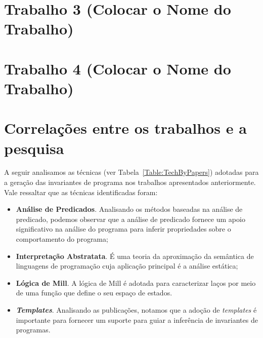 \section{Trabalho 3 (Colocar o Nome do Trabalho)}




\section{Trabalho 4 (Colocar o Nome do Trabalho)}


\section{Correlações entre os trabalhos e a pesquisa}


A seguir analisamos as técnicas (ver Tabela~\ref{Table:TechByPapers}) 
adotadas para a geração das invariantes de programa nos trabalhos apresentados anteriormente. Vale ressaltar que as técnicas identificadas foram:

\begin{itemize}
    \item \textbf{Análise de Predicados}. Analisando os métodos baseadas na análise de predicado, podemos observar que a análise de predicado fornece um apoio significativo na análise do programa para inferir propriedades sobre o comportamento do programa;
    \item \textbf{Interpretação Abstratata}. É uma teoria da aproximação da semântica de linguagens de programação cuja aplicação principal é a análise estática;
    \item \textbf{Lógica de Mill}. A lógica de Mill é adotada para caracterizar laços por meio de uma função que define o seu espaço de estados.
    \item \textbf{\textit{Templates}}. Analisando as publicações, notamos que a adoção de \textit{templates} é importante para fornecer um suporte para guiar a inferência de invariantes de programas.
\end{itemize}{}


